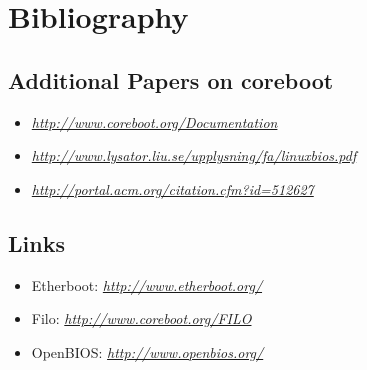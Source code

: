 \documentclass[titlepage,12pt]{article}
\begin{document}
\newpage

%
%

\section{Bibliography}
\subsection{Additional Papers on coreboot}

\begin{itemize}
 \item
 \textit{\url{http://www.coreboot.org/Documentation}}
 \item
 \textit{\url{http://www.lysator.liu.se/upplysning/fa/linuxbios.pdf}}
 \item
 \textit{\url{http://portal.acm.org/citation.cfm?id=512627}}
\end{itemize}

\subsection {Links}

\begin{itemize}
 \item Etherboot: \textit{\url{http://www.etherboot.org/}}
 \item Filo: \textit{\url{http://www.coreboot.org/FILO}}
 \item OpenBIOS: \textit{\url{http://www.openbios.org/}}
\end{itemize}
\end{document}
